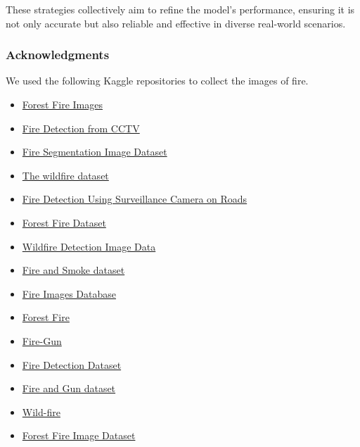 These strategies collectively aim to refine the model's performance, ensuring it is not only accurate but also reliable and effective in diverse real-world scenarios.

\subsubsection*{Acknowledgments}

We used the following Kaggle repositories to collect the images of fire.

\begin{itemize}
	\item \href{https://www.kaggle.com/datasets/mohnishsaiprasad/forest-fire-images}{Forest Fire Images}
	\item \href{https://www.kaggle.com/datasets/ritupande/fire-detection-from-cctv}{Fire Detection from CCTV}
	\item \href{https://www.kaggle.com/datasets/diversisai/fire-segmentation-image-dataset}{Fire Segmentation Image Dataset}
	\item \href{https://www.kaggle.com/datasets/elmadafri/the-wildfire-dataset}{The wildfire dataset}
	\item \href{https://www.kaggle.com/datasets/tharakan684/urecamain}{Fire Detection Using Surveillance Camera on Roads}
	\item \href{https://www.kaggle.com/datasets/alik05/forest-fire-dataset}{Forest Fire Dataset}
	\item \href{https://www.kaggle.com/datasets/brsdincer/wildfire-detection-image-data}{Wildfire Detection Image Data}
	\item \href{https://www.kaggle.com/datasets/ashutosh69/fire-and-smoke-dataset}{Fire and Smoke dataset}
	\item \href{https://www.kaggle.com/datasets/gondimjoaom/fire-images-database}{Fire Images Database}
	\item \href{https://www.kaggle.com/datasets/arbethi/forest-fire}{Forest Fire}
	\item \href{https://www.kaggle.com/datasets/parthmehta15/fire-gun}{Fire-Gun}
	\item \href{https://www.kaggle.com/datasets/christofel04/fire-detection-dataset}{Fire Detection Dataset}
	\item \href{https://www.kaggle.com/datasets/atulyakumar98/fire-and-gun-dataset}{Fire and Gun dataset}
	\item \href{https://www.kaggle.com/datasets/ashukr/wildfire}{Wild-fire}
	\item \href{https://www.kaggle.com/datasets/cristiancristancho/forest-fire-image-dataset}{Forest Fire Image Dataset}

\end{itemize}
